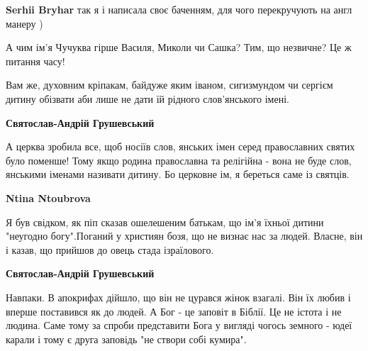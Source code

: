 \begin{itemize}
\begin{itemize}
\textbf{Serhii Bryhar} так я і написала своє баченням, для чого перекручують на англ манеру )
\end{itemize}

 

А чим ім'я Чучуква гірше Василя, Миколи чи Сашка? Тим, що незвичне? Це ж
питання часу!

Вам же, духовним кріпакам, байдуже яким іваном, сигизмундом чи сергієм дитину
обізвати аби лише не дати їй рідного слов'янського імені.

\begin{itemize}
 
\textbf{Святослав-Андрій Грушевський} 

А церква зробила все, щоб носіїв слов, янських імен серед православних святих
було поменше! Тому якщо родина православна та релігійна - вона не буде
слов, янськими іменами називати дитину. Бо церковне ім, я береться саме із
святців.


 
\textbf{Ntina Ntoubrova} 

Я був свідком, як піп сказав ошелешеним батькам, що ім'я
їхньої дитини "неугодно богу".Поганий у християн бозя, що не визнає нас за
людей. Власне, він і казав, що прийшов до овець стада ізраїлового.

 
\textbf{Святослав-Андрій Грушевський} 

Навпаки. В апокрифах дійшло, що він не цурався жінок взагалі. Він їх любив і
вперше поставився як до людей. А Бог - це заповіт в Біблії. Це не істота і не
людина. Саме тому за спроби представити Бога у вигляді чогось земного - юдеї
карали і тому є друга заповідь "не створи собі кумира".



\end{itemize}
\end{itemize}
